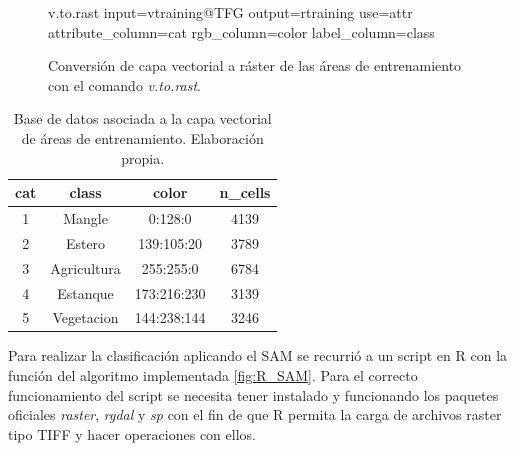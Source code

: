 \begin{figure}
	\centering
	\begin{boxedverbatim}
	v.to.rast input=vtraining@TFG output=rtraining
	use=attr attribute_column=cat
	rgb_column=color label_column=class
	\end{boxedverbatim}
	\caption[Conversión vectorial a ráster]{Conversión de capa vectorial a ráster de las áreas de entrenamiento con el comando \textit{v.to.rast}.}
	\label{fig:conversion}
\end{figure}

\begin{table}[ht]
	\centering
	\begin{tabular}{@{}cccc@{}}
	\toprule[0.4mm]
	cat & class & color & n\_cells\\
	\midrule
	1 & Mangle & 0:128:0 & 4139\\
	2 & Estero & 139:105:20 & 3789\\
	3 & Agricultura & 255:255:0 & 6784\\
	4 & Estanque & 173:216:230 & 3139\\
	5 & Vegetacion & 144:238:144 & 3246\\
	\bottomrule[0.4mm]
	\end{tabular}
	\caption[Base de datos de áreas de entrenamiento]{Base de datos asociada a la capa vectorial de áreas de entrenamiento. Elaboración propia.}
	\label{tab:tabla_training}
\end{table}

Para realizar la clasificación aplicando el \ac{SAM} se recurrió a un script en R con la función del algoritmo implementada \ref{fig:R_SAM}. Para el correcto funcionamiento del script se necesita tener instalado y funcionando los paquetes oficiales \textit{raster}, \textit{rgdal} y \textit{sp} con el fin de que R permita la carga de archivos raster tipo \ac{TIFF} y hacer operaciones con ellos.

